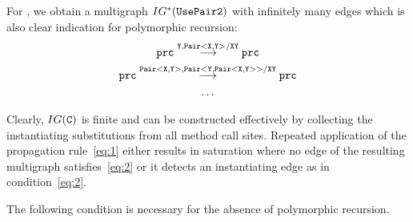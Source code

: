 For , we obtain a multigraph $IG^* ({\tt UsePair2})$ with
infinitely many edges which is also clear indication for polymorphic recursion:
\begin{gather*}
  {\tt prc} \stackrel{{\tt Y,Pair<X,Y>}/{\tt XY}}{\longrightarrow} {\tt prc}
  \\
  {\tt prc}
  \stackrel{{\tt Pair<X,Y>,Pair<Y,Pair<X,Y>>}/{\tt XY}}{\longrightarrow}
  {\tt prc}
  \\
  \dots
\end{gather*}

Clearly, $IG ({\tt C})$ is finite and can be constructed effectively by
collecting the instantiating substitutions from all method call
sites.
Repeated application of the propagation rule~\eqref{eq:1} either
results in saturation where no edge of the resulting multigraph satisfies~\eqref{eq:2} or it
detects an instantiating edge as in condition~\eqref{eq:2}. 

The following condition is necessary for the absence of
polymorphic recursion.


